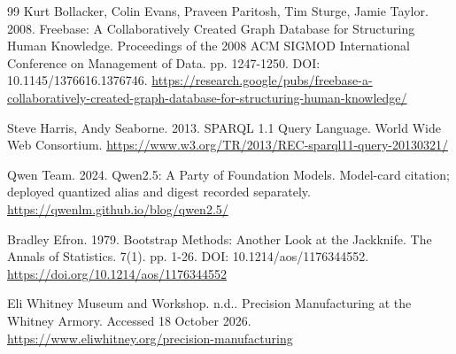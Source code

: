 \documentclass[10pt]{article}
\begin{document}
\begin{thebibliography}{99}
 Kurt Bollacker, Colin Evans, Praveen Paritosh, Tim Sturge, Jamie Taylor. 2008. Freebase: A Collaboratively Created Graph Database for Structuring Human Knowledge. Proceedings of the 2008 ACM SIGMOD International Conference on Management of Data. pp. 1247-1250. DOI: 10.1145/1376616.1376746. \url{https://research.google/pubs/freebase-a-collaboratively-created-graph-database-for-structuring-human-knowledge/}

 Steve Harris, Andy Seaborne. 2013. SPARQL 1.1 Query Language. World Wide Web Consortium. \url{https://www.w3.org/TR/2013/REC-sparql11-query-20130321/}

 Qwen Team. 2024. Qwen2.5: A Party of Foundation Models. Model-card citation; deployed quantized alias and digest recorded separately. \url{https://qwenlm.github.io/blog/qwen2.5/}

 Bradley Efron. 1979. Bootstrap Methods: Another Look at the Jackknife. The Annals of Statistics. 7(1). pp. 1-26. DOI: 10.1214/aos/1176344552. \url{https://doi.org/10.1214/aos/1176344552}

 Eli Whitney Museum and Workshop. n.d.. Precision Manufacturing at the Whitney Armory. Accessed 18 October 2026. \url{https://www.eliwhitney.org/precision-manufacturing}

\end{thebibliography}
\end{document}
